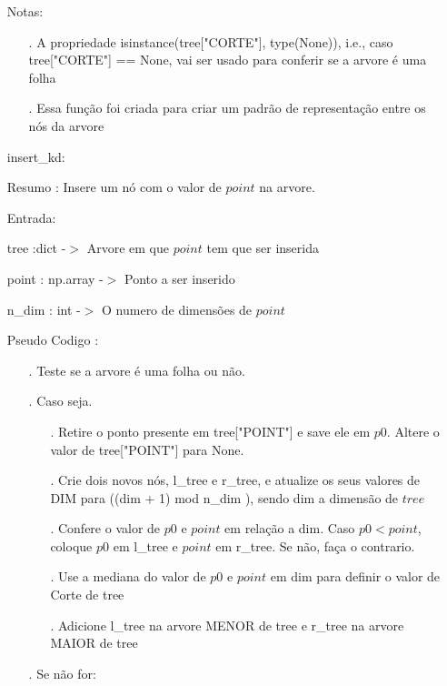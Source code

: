 \documentclass{article}
\begin{document}
\begin{enumerate}
		\quad Notas:

		\begin{enumerate}
	
		\item[.] A propriedade isinstance(tree["CORTE"], type(None)), i.e., caso tree["CORTE"] == None, vai ser usado para conferir se a arvore é uma folha
		\item[.] Essa função foi criada para criar um padrão de representação entre os nós da arvore

		\end{enumerate}

	\item[] insert\_kd: 
	
		\quad Resumo : Insere um nó com o valor de $point$ na arvore.

		\quad Entrada: 
	
			\qquad tree :dict -$>$ Arvore em que $point$ tem que ser inserida
			
			\qquad point : np.array -$>$ Ponto a ser inserido

			\qquad n\_dim : int -$>$  O numero de dimensões de $point$
	
		\quad Pseudo Codigo :
		
		\begin{enumerate}
	
		\item[.] Teste se a arvore é uma folha ou não.

		\item[.] Caso seja.
			\begin{enumerate}
			\item[.] Retire o ponto presente em tree["POINT"] e save ele em $p0$. Altere o valor de tree["POINT"] para None.
			\item[.] Crie dois novos nós, l\_tree e r\_tree, e atualize os seus valores de DIM para ((dim + 1) mod n\_dim ), sendo dim a dimensão de $tree$
			\item[.] Confere o valor de $p0$ e $point$ em relação a dim. Caso $p0 < point$, coloque $p0$ em l\_tree e $point$ em r\_tree. Se não, faça o contrario.
			\item[.] Use a mediana do valor de $p0$ e $point$ em dim para definir o valor de Corte de tree
			\item[.] Adicione l\_tree na arvore MENOR de tree e r\_tree na arvore MAIOR de tree   
			\end{enumerate}

		\item[.] Se não for:
		

\end{enumerate}
\end{enumerate}
\end{document}
